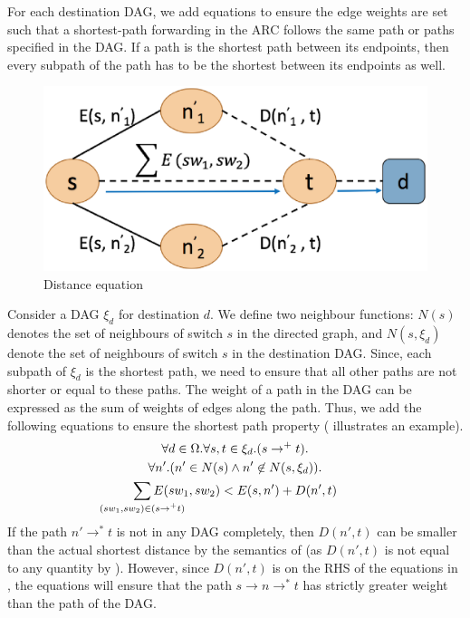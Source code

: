 For each destination DAG, we add equations to ensure the 
edge weights are set such that a shortest-path forwarding in the ARC 
follows the same path or paths specified in the DAG. If a path
is the shortest path between its endpoints, then every 
subpath of the path has to be the shortest between its endpoints
as well. 
\begin{figure}[h!] 
	\centering
	\includegraphics[width=0.8\columnwidth]{figures/distanceEquation.eps}
	\caption{Distance equation} \label{fig:disteq}
\end{figure}
Consider a DAG $\xi_d$ for destination $d$. We define two neighbour
functions: $N(s)$ denotes the set of neighbours of switch $s$ 
in the directed graph, and $N(s, \xi_d)$ denote the set of
neighbours of switch $s$ in the destination DAG. 
Since, each subpath of $\xi_d$ is the shortest path,
we need to ensure that all other
paths are not shorter or equal to these paths.  
The weight
of a path in the DAG can be expressed as the sum of weights of 
edges along the path. 
Thus, we add the following equations to ensure the
shortest path property ( illustrates 
an example).
\begin{multline} \label{eq:uniq}
		\forall d \in \Omega. \forall s, t \in \xi_d. (s \rightarrow^+ t).\\ 
		\forall n'. (n' \in N(s) \wedge n' \not\in N(s, \xi_d)). \\
		\sum_{\mathclap{\substack{(sw_1, sw_2) \in (s \rightarrow^+ t)}}} 
		E(sw_1, sw_2) < E(s, n') + D(n', t)
\end{multline}
If the path $n' \rightarrow^* t$ 
is not in any DAG completely, then
$D(n',t)$ can be smaller than the actual shortest distance by the
semantics of  (as
$D(n',t)$ is not equal to any quantity by ).
However, since $D(n',t)$ is on the RHS of the equations in ,
the equations will ensure that the path $s\rightarrow n \rightarrow^* t$
has strictly greater weight than the path of the DAG.

